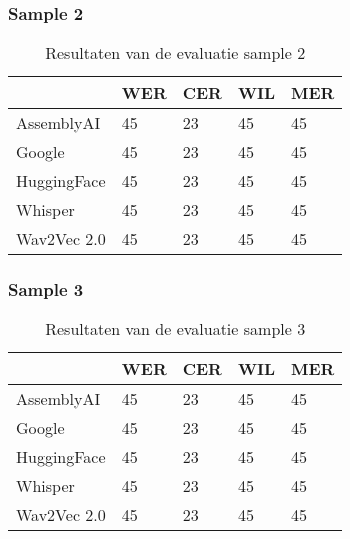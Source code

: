 \subsubsection{Sample 2}
\begin{table}[htbp]
    \centering
    \caption{Resultaten van de evaluatie sample 2}
    \label{tab:results_sample2}
    \begin{tabularx}{\textwidth}{|l|X|X|X|X|}
        \hline
        & \textbf{WER} & \textbf{CER} & \textbf{WIL} & \textbf{MER} \\ \hline
        AssemblyAI & 45 & 23 & 45 & 45 \\ \hline
        Google & 45 & 23 & 45 & 45 \\ \hline
        HuggingFace & 45 & 23 & 45 & 45 \\ \hline
        Whisper & 45 & 23 & 45 & 45 \\ \hline
        Wav2Vec 2.0 & 45 & 23 & 45 & 45 \\ \hline
    \end{tabularx}
\end{table}
\FloatBarrier


\subsubsection{Sample 3}
\begin{table}[htbp]
    \centering
    \caption{Resultaten van de evaluatie sample 3}
    \label{tab:results_sample3}
    \begin{tabularx}{\textwidth}{|l|X|X|X|X|}
        \hline
        & \textbf{WER} & \textbf{CER} & \textbf{WIL} & \textbf{MER} \\ \hline
        AssemblyAI & 45 & 23 & 45 & 45 \\ \hline
        Google & 45 & 23 & 45 & 45 \\ \hline
        HuggingFace & 45 & 23 & 45 & 45 \\ \hline
        Whisper & 45 & 23 & 45 & 45 \\ \hline
        Wav2Vec 2.0 & 45 & 23 & 45 & 45 \\ \hline
    \end{tabularx}
\end{table}
\FloatBarrier

